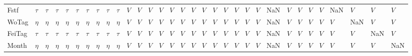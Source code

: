 \begin{tabular}{llllllllllllllllllllllllllllllll}
Fstf   &    $\tau$ &    $\tau$ &    $\tau$ &    $\tau$ &    $\tau$ &    $\tau$ &    $\tau$ &    $\tau$ &    $\tau$ &     $V$ &     $V$ &     $V$ &     $V$ &     $V$ &     $V$ &     $V$ &     $V$ &     $V$ &       $V$ &     $V$ &     $V$ &     $V$ &  NaN &     $V$ &     $V$ &     $V$ &     $V$ &     NaN &     $V$ &     $V$ &     $V$ \\
WoTag  &    $\eta$ &    $\eta$ &    $\eta$ &    $\eta$ &    $\eta$ &    $\eta$ &    $\eta$ &    $\eta$ &    $\eta$ &     $V$ &     $V$ &     $V$ &     $V$ &     $V$ &     $V$ &     $V$ &     $V$ &     $V$ &       $V$ &     $V$ &     $V$ &     $V$ &  NaN &     $V$ &     $V$ &     $V$ &     $V$ &     $V$ &     NaN &     $V$ &     $V$ \\
FeiTag &    $\tau$ &    $\tau$ &    $\tau$ &    $\tau$ &    $\tau$ &    $\tau$ &    $\tau$ &    $\tau$ &    $\tau$ &     $V$ &     $V$ &     $V$ &     $V$ &     $V$ &     $V$ &     $V$ &     $V$ &     $V$ &       $V$ &     $V$ &     $V$ &     $V$ &  NaN &     $V$ &     $V$ &     $V$ &     $V$ &     $V$ &     $V$ &     NaN &     $V$ \\
Month  &    $\eta$ &    $\eta$ &    $\eta$ &    $\eta$ &    $\eta$ &    $\eta$ &    $\eta$ &    $\eta$ &    $\eta$ &     $V$ &     $V$ &     $V$ &     $V$ &     $V$ &     $V$ &     $V$ &     $V$ &     $V$ &       $V$ &     $V$ &     $V$ &     $V$ &  NaN &     $V$ &     $V$ &     $V$ &     $V$ &     $V$ &     $V$ &     $V$ &     NaN \\
\bottomrule
\end{tabular}
